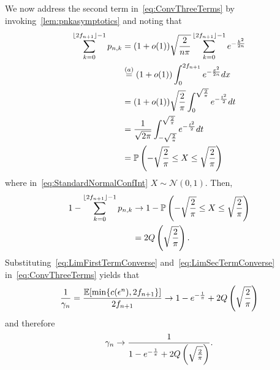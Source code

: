     We now address the second term in~\cref{eq:ConvThreeTerms} by invoking~\cref{lem:pnkasymptotics} and noting that 
    \begin{align}
       \sum_{k=0}^{\lfloor 2f_{n+1} \rfloor-1} p_{n,k} &= (1+o(1)) \sqrt{\frac{2}{n \pi}}\sum_{k=0}^{\lfloor 2f_{n+1} \rfloor-1} e^{-\frac{k^2}{2n}} \nonumber\\
       &\stackrel{(a)}{=} (1+o(1)) \int_{0}^{2f_{n+1}} e^{-\frac{x^2}{2n}} dx \nonumber\\
       &= (1+o(1)) \sqrt{\frac{2}{\pi}} \int_{0}^{\sqrt{\frac{2}{\pi}}} e^{-\frac{t^2}{2}} dt \nonumber\\
       &= \frac{1}{\sqrt{2\pi}} \int_{-\sqrt{\frac{2}{\pi}}}^{\sqrt{\frac{2}{\pi}}} e^{-\frac{t^2}{2}} dt \nonumber \\
        &= \mathbb{P}\left(-\sqrt{\frac{2}{\pi}} \le X \le \sqrt{\frac{2}{\pi}}\right) \label{eq:StandardNormalConfInt}
    \end{align}
    where in~\cref{eq:StandardNormalConfInt} $X \sim \mathcal{N}(0,1)$. Then, 
    \begin{align}
        1- \sum_{k=0}^{\lfloor 2f_{n+1} \rfloor-1} p_{n,k}  &\to 1-\mathbb{P}\left(-\sqrt{\frac{2}{\pi}} \le X \le \sqrt{\frac{2}{\pi}}\right) \nonumber\\
        &= 2Q\left(\sqrt{\frac{2}{\pi}}\right) \label{eq:LimSecTermConverse}. 
    \end{align}
    Substituting~\cref{eq:LimFirstTermConverse} and~\cref{eq:LimSecTermConverse} in~\cref{eq:ConvThreeTerms} yields that 
    \begin{align}
     \frac{1}{\gamma_n} = \frac{\operatorname{\mathbb{E}}[\min\{c(\epsilon^n), 2f_{n+1}\}]}{2f_{n+1}} \to 1-e^{-\frac{1}{\pi}} + 2Q\left(\sqrt{\frac{2}{\pi}}\right)
    \end{align}
    and therefore 
    \begin{align}\label{eq:finalGammaLimit}
        \gamma_n \to \frac{1}{1-e^{-\frac{1}{\pi}} + 2Q\left(\sqrt{\frac{2}{\pi}}\right)}. 
    \end{align}


